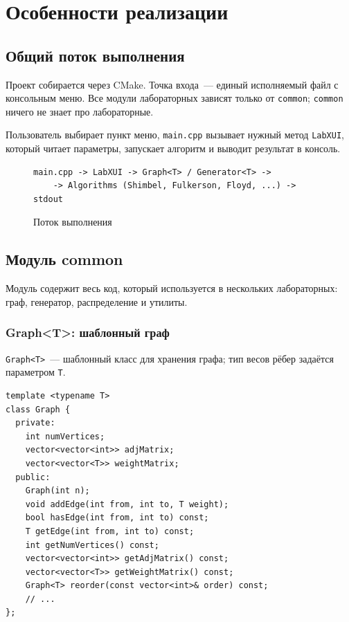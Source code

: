 \section{Особенности реализации}

\subsection{Общий поток выполнения}

Проект собирается через CMake. Точка входа~--- единый исполняемый файл
с консольным меню. Все модули лабораторных зависят только от \texttt{common};
\texttt{common} ничего не знает про лабораторные.

Пользователь выбирает пункт меню, \texttt{main.cpp} вызывает нужный метод
\texttt{LabXUI}, который читает параметры, запускает алгоритм и выводит
результат в консоль.

\begin{figure}[h]
\centering
\begin{verbatim}
main.cpp -> LabXUI -> Graph<T> / Generator<T> ->
    -> Algorithms (Shimbel, Fulkerson, Floyd, ...) -> stdout
\end{verbatim}
\caption{Поток выполнения}
\end{figure}

\subsection{Модуль common}

Модуль содержит весь код, который используется в нескольких лабораторных:
граф, генератор, распределение и утилиты.

\subsubsection{Graph\textless T\textgreater: шаблонный граф}

\texttt{Graph<T>}~--- шаблонный класс для хранения графа; тип весов рёбер
задаётся параметром \texttt{T}.

\begin{lstlisting}[style=cstyle, caption={Объявление Graph (graph.h)}]
template <typename T>
class Graph {
  private:
    int numVertices;
    vector<vector<int>> adjMatrix;
    vector<vector<T>> weightMatrix;
  public:
    Graph(int n);
    void addEdge(int from, int to, T weight);
    bool hasEdge(int from, int to) const;
    T getEdge(int from, int to) const;
    int getNumVertices() const;
    vector<vector<int>> getAdjMatrix() const;
    vector<vector<T>> getWeightMatrix() const;
    Graph<T> reorder(const vector<int>& order) const;
    // ...
};
\end{lstlisting}

